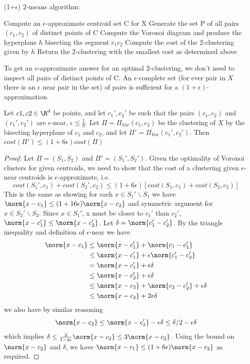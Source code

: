 \begin{algorithm}[H]
  \caption{(1+$\epsilon$) $2$-means algorithm:}
\begin{algorithmic} 
\STATE Compute an $\epsilon$-approximate centroid set C for X
\STATE Generate the set P of all pairs $(c_1, c_2)$ of distinct points of C
    \STATE Compute the Voronoi diagram and produce the hyperplane $h$ bisecting the segment $c_1 c_2$
    \STATE Compute the cost of the 2-clustering given by $h$
\ENDFOR
\STATE Return the 2-clustering with the smallest cost as determined above
\end{algorithmic}
\end{algorithm}

To get an $\epsilon$-approximate answer for an optimal 2-clustering, we don't need to inspect all pairs of distinct points of C.  An $\epsilon$-complete set (for ever pair in $X$ there is an $\epsilon$ near pair in the set) of pairs is sufficient for a $(1+\epsilon)$-approximation. 

\begin{lemma}
Let $c1, c2 \in \R^d$ be points, and let $c_1', c_2'$ be such that the pairs $(c_1,c_2)$ and $(c_1',c_2')$ are $\epsilon$-near, $\epsilon \leq \frac{1}{9}$. Let $\Pi = \Pi_{Vor}(c_1, c_2)$ be the clustering of $X$ by the bisecting hyperplane of $c_1$ and $c_2$, and let $\Pi' = \Pi_{Vor}(c_1', c_2')$. Then $cost(\Pi')\leq (1+ 6 \epsilon)cost(\Pi)$
\end{lemma}

\begin{proof}
Let $\Pi = (S_1, S_2)$ and $\Pi' = (S_1', S_2')$. Given the optimality of Voronoi
  clusters for given centroids, we need to show that the cost of a clustering
  given $\epsilon$-near centroids is $\epsilon$-approximate, i.e. $$cost(S_1', c_1)
  + cost(S_2' , c_2) \leq (1 + 6\epsilon)[cost(S_1, c_1) + cost(S_2 , c_2)]$$ This
  is the same as showing for each $x \in S_1' \backslash S_1$ we have $\norm{x-c_1}
  \leq (1+16\epsilon)\norm{x-c_2}$ and symmetric argument for $x \in S_2' \backslash S_2$.
  Since $x \in S_1'$, x must be closer to $c_1'$ than $c_2'$, $\norm{x-c_1'}\leq  \norm{x-c_2'}$.
  Let $\delta = \norm{c_1'-c_2'}$. By the triangle inequality and definition of $\epsilon$-near we have
\begin{align*}
    \norm{x-c_1} &  \leq \norm{x-c_1'} + \norm{c_1-c_1'} \\
    & \leq \norm{x-c_1'} + \epsilon \norm{c_1'-c_2'}\\
    & = \norm{x-c_1'} + \epsilon \delta \\
    & \leq \norm{x-c_2'}+ \epsilon \delta \\
    & \leq \norm{x-c_2} + \norm{c_2-c_2'} + \epsilon \delta \\
    & \leq \norm{x-c_2} + 2\epsilon \delta
\end{align*}
we also have by similar reasoning
$$\norm{x-c_2}\leq \norm{x-c_2'} - \epsilon \delta \leq \delta/2 - \epsilon \delta$$
which implies $\delta \leq \frac{2}{1-2\epsilon}\norm{x-c_2}\leq 3 \norm{x-c_2}$. Using the bound on $\norm{x-c_2}$ and $\delta$, we have $\norm{x-c_1} \leq (1+ 6\epsilon)\norm{x-c_2}$ as required. 
\end{proof}

